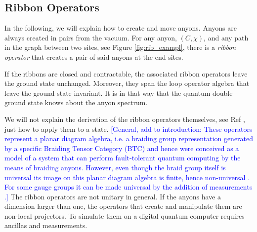 \documentclass[two column]{article}
\newcommand{\jovan}[1]{\textcolor{blue}{[#1]}}
\begin{document}
\subsection{Ribbon Operators}\label{sec:ribbon_ops}

In the following, we will explain how to create and move anyons. Anyons are always created in pairs from the vacuum. 
%
%
%
For any anyon, $(C, \chi)$, and any path in the graph between two sites, see Figure \ref{fig:rib_exampl}, there is a \emph{ribbon operator} that creates a pair of said anyons at the end sites. 

If the ribbons are closed and contractable, the associated ribbon operators leave the ground state unchanged. Moreover, they span the loop operator algebra that leave the ground state invariant. It is in that way that the quantum double ground state knows about the anyon spectrum.

We will not explain the derivation of the ribbon operators themselves, see Ref \cite{Kitaev_2003,cui2018topological}, just how to apply them to a state.
%
\jovan{General, add to introduction: These operators represent a planar diagram algebra, i.e. a braiding group representation generated by a specific Braiding Tensor Category (BTC) and hence were conceived as a model of a system that can perform fault-tolerant quantum computing by the means of braiding anyons.
However, even though the braid group itself is universal its image on this planar diagram algebra is finite, hence non-universal \cite{cui2018topological}. For some gauge groups it can be made universal by the addition of measurements \cite{Cui_2015}.}
%
The ribbon operators are not unitary in general. If the anyons have a dimension larger than one, the operators that create and manipulate them are non-local projectors. To simulate them on a digital quantum computer requires ancillas and measurements. 
\end{document}
